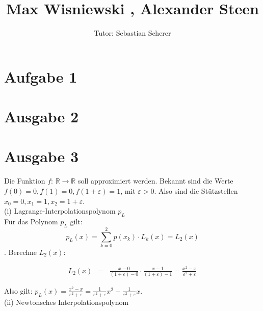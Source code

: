 \documentclass[11pt,a4paper,ngerman]{article}
\author{Tutor: Sebastian Scherer}
\date{}
\title{Max Wisniewski , Alexander Steen}
\begin{document}

\maketitle
\thispagestyle{fancy}



\section*{Aufgabe 1}


\section*{Ausgabe 2}



\section*{Ausgabe 3}
Die Funktion $f: \, \mathbb{R} \to \mathbb{R}$ soll approximiert werden. Bekannt sind die Werte $f(0) = 0, f(1) = 0, f(1 + \varepsilon) = 1$, mit $\varepsilon > 0$. Also sind die Stützstellen $x_0 = 0, x_1 = 1, x_2 = 1 + \varepsilon$.\\

(i) Lagrange-Interpolationspolynom $p_L$\\

Für das Polynom $p_L$ gilt:
$$ p_L(x) = \sum_{k=0}^{2}{p(x_k) \cdot L_k(x)} = L_2(x) $$.
Berechne $L_2(x)$:

\begin{eqnarray*}
L_2(x) &=& \frac{x-0}{(1+\varepsilon)-0} \cdot \frac{x-1}{(1+\varepsilon) - 1} = \frac{x^2-x}{\varepsilon^2 + \varepsilon}
\end{eqnarray*}

Also gilt:
$ p_L(x) = \frac{x^2-x}{\varepsilon^2 + \varepsilon} = \frac{1}{\varepsilon^2 + \varepsilon}x^2 - \frac{1}{\varepsilon^2 + \varepsilon}x$.
\\
(ii) Newtonsches Interpolationspolynom \\
\end{document}

